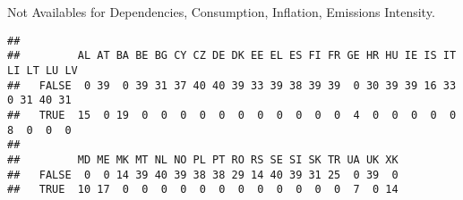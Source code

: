 \documentclass[
]{article}
\newenvironment{Shaded}{\begin{snugshade}}{\end{snugshade}}
\newcommand{\ControlFlowTok}[1]{\textcolor[rgb]{0.13,0.29,0.53}{\textbf{#1}}}
\newcommand{\DataTypeTok}[1]{\textcolor[rgb]{0.13,0.29,0.53}{#1}}
\newcommand{\DecValTok}[1]{\textcolor[rgb]{0.00,0.00,0.81}{#1}}
\newcommand{\KeywordTok}[1]{\textcolor[rgb]{0.13,0.29,0.53}{\textbf{#1}}}
\newcommand{\NormalTok}[1]{#1}
\newcommand{\OperatorTok}[1]{\textcolor[rgb]{0.81,0.36,0.00}{\textbf{#1}}}
\newcommand{\StringTok}[1]{\textcolor[rgb]{0.31,0.60,0.02}{#1}}
\begin{document}
\begin{Shaded}
\end{Shaded}

Not Availables for Dependencies, Consumption, Inflation, Emissions
Intensity.

\begin{Shaded}
\end{Shaded}

\begin{verbatim}
##        
##         AL AT BA BE BG CY CZ DE DK EE EL ES FI FR GE HR HU IE IS IT LI LT LU LV
##   FALSE  0 39  0 39 31 37 40 40 39 33 39 38 39 39  0 30 39 39 16 33  0 31 40 31
##   TRUE  15  0 19  0  0  0  0  0  0  0  0  0  0  0  4  0  0  0  0  0  8  0  0  0
##        
##         MD ME MK MT NL NO PL PT RO RS SE SI SK TR UA UK XK
##   FALSE  0  0 14 39 40 39 38 38 29 14 40 39 31 25  0 39  0
##   TRUE  10 17  0  0  0  0  0  0  0  0  0  0  0  0  7  0 14
\end{verbatim}
\end{document}
